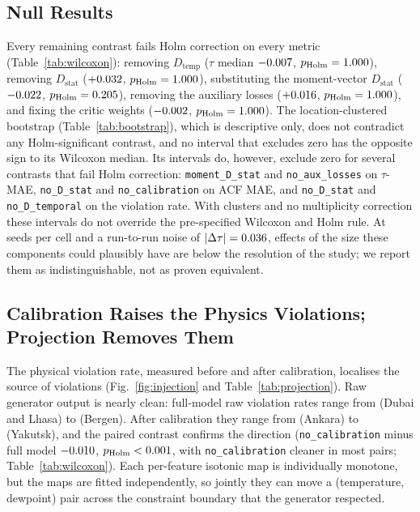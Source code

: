 \documentclass[preprint,12pt]{elsarticle}
\newcommand{\abs}[1]{\left| #1 \right|}
\newcommand{\Dtemp}{D_{\mathrm{temp}}}
\newcommand{\Dstat}{D_{\mathrm{stat}}}
\begin{document}
\subsection{Null Results}
\label{sec:results_ablation}

Every remaining contrast fails Holm correction on every metric
(Table~\ref{tab:wilcoxon}): removing $\Dtemp$
($\tau$ median $-0.007$, $p_{\mathrm{Holm}} = 1.000$), removing $\Dstat$
($+0.032$, $p_{\mathrm{Holm}} = 1.000$), substituting the moment-vector
$\Dstat$ ($-0.022$, $p_{\mathrm{Holm}} = 0.205$), removing the auxiliary
losses ($+0.016$, $p_{\mathrm{Holm}} = 1.000$), and fixing the critic
weights ($-0.002$, $p_{\mathrm{Holm}} = 1.000$).  The
location-clustered bootstrap (Table~\ref{tab:bootstrap}), which is
descriptive only, does not contradict any Holm-significant contrast, and
no interval that excludes zero has the opposite sign to its Wilcoxon
median.  Its
intervals do, however, exclude zero for several contrasts that fail Holm
correction: \texttt{moment\_D\_stat} and \texttt{no\_aux\_losses} on
$\tau$-MAE, \texttt{no\_D\_stat} and \texttt{no\_calibration} on ACF MAE,
and \texttt{no\_D\_stat} and \texttt{no\_D\_temporal} on the violation
rate.  With \nLocs{} clusters and no multiplicity correction these
intervals do not override the pre-specified Wilcoxon and Holm rule.  At
\nSeeds{} seeds per cell and a
run-to-run noise of $\abs{\Delta\tau} = \runNoiseDtau$, effects of the
size these components could plausibly have are below the resolution of
the study; we report them as indistinguishable, not as proven
equivalent.

\subsection{Calibration Raises the Physics Violations; Projection
            Removes Them}
\label{sec:results_cal}

The physical violation rate, measured before and after calibration,
localises the source of violations (Fig.~\ref{fig:injection} and
Table~\ref{tab:projection}).  Raw generator output is
nearly clean: full-model raw violation rates range from \physRawDubai{}
(Dubai and Lhasa) to \physRawBergen{} (Bergen).  After calibration they
range from \physCalAnkara{} (Ankara) to \physCalYakutsk{} (Yakutsk), and
the paired contrast confirms the direction
(\texttt{no\_calibration} minus full model $-0.010$,
$p_{\mathrm{Holm}}<0.001$, with \texttt{no\_calibration}
cleaner in most pairs; Table~\ref{tab:wilcoxon}).  Each per-feature isotonic map is individually
monotone, but the maps are fitted independently, so jointly they can
move a (temperature, dewpoint) pair across the constraint boundary that
the generator respected.
\end{document}
